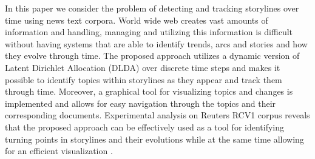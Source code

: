 In this paper we consider the problem of detecting and tracking storylines over time using news text corpora. World wide web creates vast amounts of information and handling, managing and utilizing this information is difficult without having systems that are able to identify trends, arcs and stories and how they evolve through time. The proposed approach utilizes a dynamic version of Latent Dirichlet Allocation (DLDA) over discrete time steps and makes it possible to identify topics within storylines as they appear and track them through time. Moreover, a graphical tool for visualizing topics and changes is implemented and allows for easy navigation through the topics and their corresponding documents. Experimental analysis on Reuters RCV1 corpus reveals that the proposed approach can be effectively used as a tool for identifying turning points in storylines and their evolutions while at the same time allowing for an efficient visualization .
